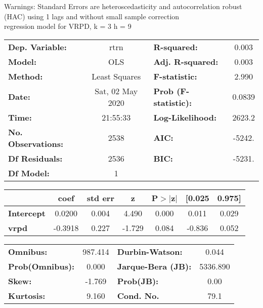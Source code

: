Warnings: \newline
 [1] Standard Errors are heteroscedasticity and autocorrelation robust (HAC) using 1 lags and without small sample correction\\ 

regression model for VRPD, k = 3 h = 9\begin{center}
\begin{tabular}{lclc}
\toprule
\textbf{Dep. Variable:}    &       rtrn       & \textbf{  R-squared:         } &     0.003   \\
\textbf{Model:}            &       OLS        & \textbf{  Adj. R-squared:    } &     0.003   \\
\textbf{Method:}           &  Least Squares   & \textbf{  F-statistic:       } &     2.990   \\
\textbf{Date:}             & Sat, 02 May 2020 & \textbf{  Prob (F-statistic):} &   0.0839    \\
\textbf{Time:}             &     21:55:33     & \textbf{  Log-Likelihood:    } &    2623.2   \\
\textbf{No. Observations:} &        2538      & \textbf{  AIC:               } &    -5242.   \\
\textbf{Df Residuals:}     &        2536      & \textbf{  BIC:               } &    -5231.   \\
\textbf{Df Model:}         &           1      & \textbf{                     } &             \\
\bottomrule
\end{tabular}
\begin{tabular}{lcccccc}
                   & \textbf{coef} & \textbf{std err} & \textbf{z} & \textbf{P$> |$z$|$} & \textbf{[0.025} & \textbf{0.975]}  \\
\midrule
\textbf{Intercept} &       0.0200  &        0.004     &     4.490  &         0.000        &        0.011    &        0.029     \\
\textbf{vrpd}      &      -0.3918  &        0.227     &    -1.729  &         0.084        &       -0.836    &        0.052     \\
\bottomrule
\end{tabular}
\begin{tabular}{lclc}
\textbf{Omnibus:}       & 987.414 & \textbf{  Durbin-Watson:     } &    0.044  \\
\textbf{Prob(Omnibus):} &   0.000 & \textbf{  Jarque-Bera (JB):  } & 5336.890  \\
\textbf{Skew:}          &  -1.769 & \textbf{  Prob(JB):          } &     0.00  \\
\textbf{Kurtosis:}      &   9.160 & \textbf{  Cond. No.          } &     79.1  \\
\bottomrule
\end{tabular}
\end{center}

